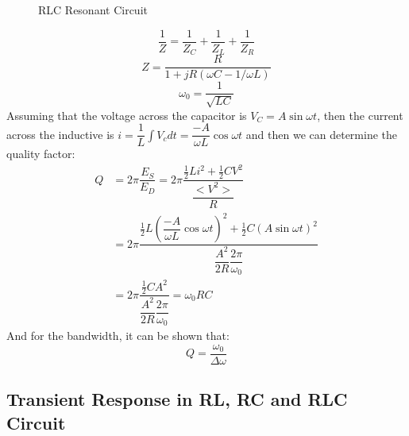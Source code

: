 \documentclass[UTF8]{article}
\begin{document}
\begin{itemize}
\begin{figure}[H]
\begin{center}
    \caption{RLC Resonant Circuit}
  \end{center}
\end{figure}
$$\dfrac{1}{Z}=\dfrac{1}{Z_C}+\dfrac{1}{Z_L}+\dfrac{1}{Z_R}$$
$$Z=\dfrac{R}{1+jR(\omega C-1/\omega L)}$$
$$\omega _0=\dfrac{1}{\sqrt{LC}}$$
 {Assuming that the voltage across the capacitor is $V_C=A\sin \omega t$, then the current across the inductive is $i=\dfrac{1}{L}\int V_cdt=\dfrac{-A}{\omega L}\cos \omega t$ and then we can determine the quality factor:}
\begin{align*}
Q&=2\pi \dfrac{E_S}{E_D}=2\pi \dfrac{\frac{1}{2}Li^2+\frac{1}{2}CV^2}{\dfrac{<V^2>}{R}}\\
&=2\pi \dfrac{\frac{1}{2}L(\dfrac{-A}{\omega L}\cos \omega t)^2+\frac{1}{2}C(A\sin \omega t)^2}{\dfrac{A^2}{2R}\dfrac{2\pi}{\omega _0}}\\
&=2\pi \dfrac{\frac{1}{2}CA^2}{\dfrac{A^2}{2R}\dfrac{2\pi}{\omega _0}}=\omega _0 RC
\end{align*}
 {And for the bandwidth, it can be shown that: }
$$Q=\dfrac{\omega _0}{\Delta\omega }$$
\end{itemize}

\subsection{Transient Response in RL, RC and RLC Circuit}
\end{document}
